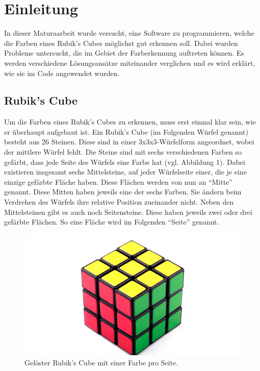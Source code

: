\documentclass[a4paper, 12pt]{article}
\begin{document}
\section{Einleitung}
In dieser Maturaarbeit wurde versucht, eine Software zu programmieren, welche die Farben eines Rubik's Cubes möglichst gut erkennen soll. Dabei wurden Probleme untersucht, die im Gebiet der Farberkennung auftreten können. Es werden verschiedene Lösungsansätze miteinander verglichen und es wird erklärt, wie sie im Code angewendet wurden.
\subsection{Rubik's Cube}
Um die Farben eines Rubik's Cubes zu erkennen, muss erst einmal klar sein, wie er überhaupt aufgebaut ist. Ein Rubik's Cube (im Folgenden Würfel genannt) besteht aus 26 Steinen. Diese sind in einer 3x3x3-Würfelform angeordnet, wobei der mittlere Würfel fehlt. Die Steine sind mit sechs verschiedenen Farben so gefärbt, dass jede Seite des Würfels eine Farbe hat (vgl. Abbildung 1).
\newline
Dabei existieren insgesamt sechs Mittelsteine, auf jeder Würfelseite einer, die je eine einzige gefärbte Fläche haben. Diese Flächen werden von nun an "`Mitte"' genannt. Diese Mitten haben jeweils eine der sechs Farben. Sie ändern beim Verdrehen des Würfels ihre relative Position zueinander nicht.
\newline
Neben den Mittelsteinen gibt es auch noch Seitensteine. Diese haben jeweils zwei oder drei gefärbte Flächen. So eine Fläche wird im Folgenden "`Seite"' genannt.
\begin{figure}[h]
\includegraphics[scale=1.5]{Wuerfel_Billd}
\caption{Gelöster Rubik's Cube mit einer Farbe pro Seite. \cite{Wuerfelbild}}
\end{figure}
\end{document}
